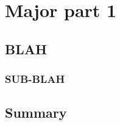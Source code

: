 \chapter{Major part 1}
\label{chap:chap3}

\textit{\fontsize{14pt}{\baselineskip}\selectfont{
		\lipsum[1]
}}
\newpage

\section{BLAH}
\lipsum[1]

\subsection{SUB-BLAH}
\lipsum[2]

\section{Summary}
\lipsum[3]

\forcedoublepage